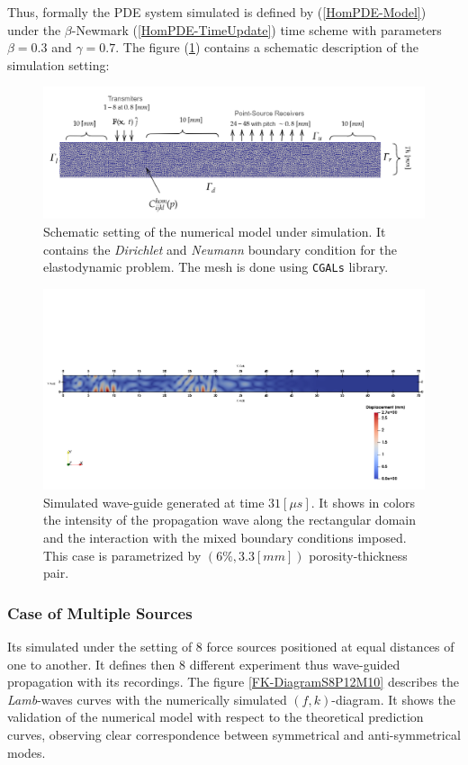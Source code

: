 Thus, formally the PDE system simulated is defined by (\ref{HomPDE-Model}) under the $\beta$-Newmark (\ref{HomPDE-TimeUpdate}) time scheme with parameters $\beta = 0.3$ and $\gamma = 0.7$.
The figure (\ref{MeshFile2D}) contains a schematic description of the simulation setting:
\begin{figure}[!h]
	\centering
	\includegraphics[width=\textwidth]{images/ImgExt/SimP5TransIso12M780-MeshFile.png}
	\caption{Schematic setting of the numerical model under simulation. It contains the \textit{Dirichlet} and \textit{Neumann} boundary condition for the elastodynamic problem. The mesh is done using \texttt{CGALs} library.}
	\label{MeshFile2D}
\end{figure}

\begin{figure}[!h]
	\centering
	\includegraphics[width=\textwidth]{images/ImgExt/SimP6TransIso33M780T310.png}
	\caption{Simulated wave-guide generated at time $31 [\mu s]$. It shows in colors the intensity of the propagation wave along the rectangular domain and the interaction with the mixed boundary conditions imposed. This case is parametrized by $(6\%, 3.3 [mm])$ porosity-thickness pair.}
	\label{Sim2D-TimeStep}
\end{figure}


\subsubsection{Case of Multiple Sources}
Its simulated under the setting of 8 force sources positioned at equal distances of one to another. It defines then 8 different experiment thus wave-guided propagation with its recordings.
The figure \ref{FK-DiagramS8P12M10} describes the \textit{Lamb}-waves curves with the numerically simulated $(f,k)$-diagram. It shows the validation of the numerical model with respect to the theoretical prediction curves, observing clear correspondence between symmetrical and anti-symmetrical modes.

